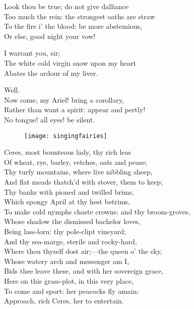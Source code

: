 \begin{verse_speech}[Prospero] 
Look thou be true; do not give dalliance\\
Too much the rein: the strongest oaths are straw\\
To the fire i' the blood: be more abstemious,\\
Or else, good night your vow!
\end{verse_speech}

\begin{verse_speech}[Ferdinand] 
I warrant you, sir;\\
The white cold virgin snow upon my heart\\
Abates the ardour of my liver.
\end{verse_speech}

\begin{verse_speech}[Prospero] 
Well.\\
Now come, my Ariel! bring a corollary,\\
Rather than want a spirit: appear and pertly!\\
No tongue! all eyes! be silent.
\end{verse_speech}


\begin{letter}
	\begin{figure}[tb]
		\centering
		\texttt{[image: singingfairies]}
	\end{figure}
\end{letter}

\begin{verse_speech}[Iris] 
Ceres, most bounteous lady, thy rich leas\\
Of wheat, rye, barley, vetches, oats and pease;\\
Thy turfy mountains, where live nibbling sheep,\\
And flat meads thatch'd with stover, them to keep;\\
Thy banks with pioned and twilled brims,\\
Which spongy April at thy hest betrims,\\
To make cold nymphs chaste crowns; and thy broom-groves,\\
Whose shadow the dismissed bachelor loves,\\
Being lass-lorn: thy pole-clipt vineyard;\\
And thy sea-marge, sterile and rocky-hard,\\
Where thou thyself dost air;—the queen o' the sky,\\
Whose watery arch and messenger am I,\\
Bids thee leave these, and with her sovereign grace,\\
Here on this grass-plot, in this very place,\\
To come and sport: her peacocks fly amain:\\
Approach, rich Ceres, her to entertain.
\end{verse_speech}

